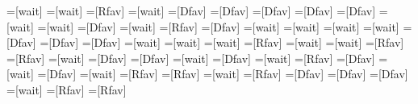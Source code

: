 =[wait]	%
=[wait]	%
=[Rfav]	%
=[wait]	%
=[Dfav]	%
=[Dfav]	%
=[Dfav]	%
=[Dfav]	%
=[Dfav]	%
=[wait]	%
=[wait]	%
=[Dfav]	%
=[wait]	%
=[Rfav]	%
=[Dfav]	%
=[wait]	%
=[wait]	%
=[wait]	%
=[wait]	%
=[Dfav]	%
=[Dfav]	%
=[Dfav]	%
=[wait]	%
=[wait]	%
=[wait]	%
=[Rfav]	%
=[wait]	%
=[wait]	%
=[Rfav]	%
=[Rfav]	%
=[wait]	%
=[Dfav]	%
=[Dfav]	%
=[wait]	%
=[Dfav]	%
=[wait]	%
=[Rfav]	%
=[Dfav]	%
=[wait]	%
=[Dfav]	%
=[wait]	%
=[Rfav]	%
=[Rfav]	%
=[wait]	%
=[Rfav]	%
=[Dfav]	%
=[Dfav]	%
=[Dfav]	%
=[wait]	%
=[Rfav]	%
=[Rfav]	%

